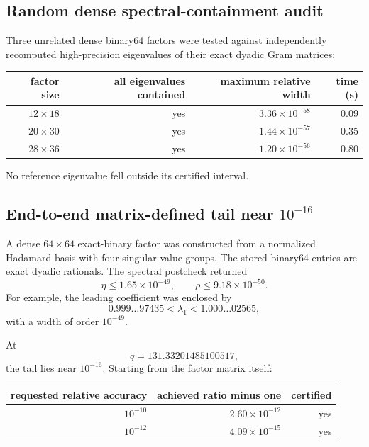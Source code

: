 \documentclass[11pt]{article}
\theoremstyle{definition}
\theoremstyle{remark}
\begin{document}
\subsection{Random dense spectral-containment audit}

Three unrelated dense binary64 factors were tested against independently
recomputed high-precision eigenvalues of their exact dyadic Gram matrices:

\begin{center}
\begin{tabular}{@{}rrrr@{}}
\toprule
factor size & all eigenvalues contained & maximum relative width & time (s)\\
\midrule
$12\times18$ & yes & $3.36\times10^{-58}$ & 0.09\\
$20\times30$ & yes & $1.44\times10^{-57}$ & 0.35\\
$28\times36$ & yes & $1.20\times10^{-56}$ & 0.80\\
\bottomrule
\end{tabular}
\end{center}

No reference eigenvalue fell outside its certified interval.

\subsection{End-to-end matrix-defined tail near \texorpdfstring{\(10^{-16}\)}{1e-16}}

A dense \(64\times64\) exact-binary factor was constructed from a normalized
Hadamard basis with four singular-value groups.  The stored binary64 entries
are exact dyadic rationals.  The spectral postcheck returned
\[
\eta\le1.65\times10^{-49},
\qquad
\rho\le9.18\times10^{-50}.
\]
For example, the leading coefficient was enclosed by
\[
0.999\ldots97435
<
\lambda_1
<
1.000\ldots02565,
\]
with a width of order \(10^{-49}\).

At
\[
q=131.33201485100517,
\]
the tail lies near \(10^{-16}\).  Starting from the factor matrix itself:

\begin{center}
\begin{tabular}{@{}rrr@{}}
\toprule
requested relative accuracy & achieved ratio minus one & certified\\
\midrule
$10^{-10}$ & $2.60\times10^{-12}$ & yes\\
$10^{-12}$ & $4.09\times10^{-15}$ & yes\\
\bottomrule
\end{tabular}
\end{center}
\end{document}
